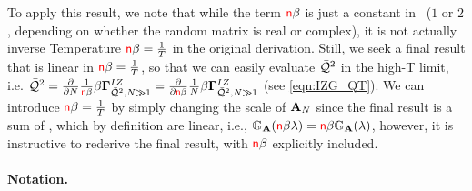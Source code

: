 To apply this result, we note that
while the term ${\color{red}\sf{n}}\beta$ is just a constant in~\cite{Tanaka2008}
($1$ or $2$, depending on whether the random matrix is real or complex),
it is not actually inverse Temperature ${\color{red}\sf{n}}\beta=\tfrac{1}{T}$ in the original derivation.
Still, we seek a final result that is linear in ${\color{red}\sf{n}}\beta=\tfrac{1}{T}$,
so that we can easily evaluate $\bar{\mathcal{Q}}^{2}$ in the high-T limit, i.e.
$\bar{\mathcal{Q}}^{2}
=\tfrac{\partial}{\partial N}\tfrac{1}{{\color{red}\sf{n}}\beta}\beta\mathbf{\Gamma}^{IZ}_{\bar{\mathcal{Q}}^{2},N\gg 1}
=\tfrac{\partial}{\partial {\color{red}\sf{n}}\beta}\tfrac{1}{N}\beta\mathbf{\Gamma}^{IZ}_{\bar{\mathcal{Q}}^{2},N\gg 1}$
(see \ref{eqn:IZG_QT}).
We can introduce ${\color{red}\sf{n}}\beta=\tfrac{1}{T}$ by
simply changing the scale of $\mathbf{A}_N$ since the final result is a sum of \RTransforms, which by definition
are linear, i.e., $\mathbb{G}_{\mathbf{A}}({\color{red}\sf{n}}\beta\lambda)={\color{red}\sf{n}}\beta \mathbb{G}_{\mathbf{A}}(\lambda)$, however, it is instructive
to rederive the final result, with ${\color{red}\sf{n}}\beta$ explicitly included.


\paragraph{Notation.}

